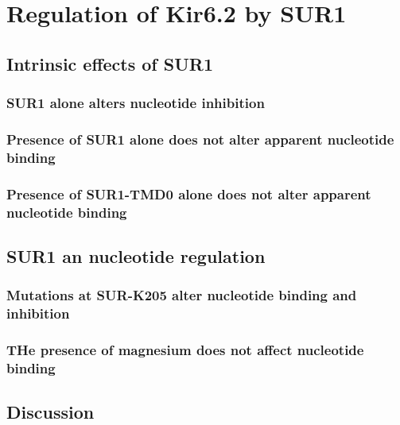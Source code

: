 \chapter{\label{ch:6}Regulation of Kir6.2 by SUR1} 

\graphicspath{{figures/ch6/}}

\minitoc

\section{Intrinsic effects of SUR1}

\subsection{SUR1 alone alters nucleotide inhibition}

\subsection{Presence of SUR1 alone does not alter apparent nucleotide binding}

\subsection{Presence of SUR1-TMD0 alone does not alter apparent nucleotide binding}

\section{SUR1 an nucleotide regulation}

\subsection{Mutations at SUR-K205 alter nucleotide binding and inhibition}

\subsection{THe presence of magnesium does not affect nucleotide binding}

\section{Discussion}